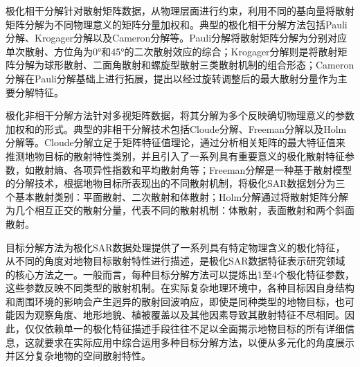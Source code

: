 极化相干分解针对散射矩阵数据，从物理层面进行约束，利用不同的基向量将散射矩阵分解为不同物理意义的矩阵分量加权和。典型的极化相干分解方法包括Pauli分解、Krogager分解以及Cameron分解等。Pauli分解将散射矩阵分解为分别对应单次散射、方位角为0°和45°的二次散射效应的综合；Krogager分解则是将散射矩阵分解为球形散射、二面角散射和螺旋型散射三类散射机制的组合形态；Cameron分解在Pauli分解基础上进行拓展，提出以经过旋转调整后的最大散射分量作为主要分解特征。


极化非相干分解方法针对多视矩阵数据，将其分解为多个反映确切物理意义的参数加权和的形式。典型的非相干分解技术包括Cloude分解、Freeman分解以及Holm分解等。Cloude分解立足于矩阵特征值理论，通过分析相关矩阵的最大特征值来推测地物目标的散射特性类别，并且引入了一系列具有重要意义的极化散射特征参数，如散射熵、各项异性指数和平均散射角等；Freeman分解是一种基于散射模型的分解技术，根据地物目标所表现出的不同散射机制，将极化SAR数据划分为三个基本散射类别：平面散射、二次散射和体散射；Holm分解通过将散射矩阵分解为几个相互正交的散射分量，代表不同的散射机制：体散射，表面散射和两个斜面散射。

目标分解方法为极化SAR数据处理提供了一系列具有特定物理含义的极化特征，从不同的角度对地物目标散射特性进行描述，是极化SAR数据特征表示研究领域的核心方法之一。一般而言，每种目标分解方法可以提炼出1至4个极化特征参数，这些参数反映不同类型的散射机制。在实际复杂地理环境中，各种目标因自身结构和周围环境的影响会产生迥异的散射回波响应，即使是同种类型的地物目标，也可能因为观察角度、地形地貌、植被覆盖以及其他因素导致其散射特征不尽相同。因此，仅仅依赖单一的极化特征描述手段往往不足以全面揭示地物目标的所有详细信息，这就要求在实际应用中综合运用多种目标分解方法，以便从多元化的角度展示并区分复杂地物的空间散射特性。



